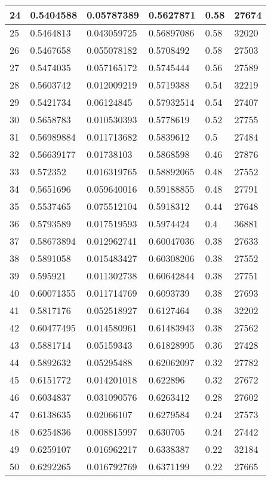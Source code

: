 \begin{longtable}{|l|l|l|l|l|l|}
24 & 0.5404588 & 0.05787389 & 0.5627871 & 0.58 & 27674 \\ \hline 
25 & 0.5464813 & 0.043059725 & 0.56897086 & 0.58 & 32020 \\ \hline 
26 & 0.5467658 & 0.055078182 & 0.5708492 & 0.58 & 27503 \\ \hline 
27 & 0.5474035 & 0.057165172 & 0.5745444 & 0.56 & 27589 \\ \hline 
28 & 0.5603742 & 0.012009219 & 0.5719388 & 0.54 & 32219 \\ \hline 
29 & 0.5421734 & 0.06124845 & 0.57932514 & 0.54 & 27407 \\ \hline 
30 & 0.5658783 & 0.010530393 & 0.5778619 & 0.52 & 27755 \\ \hline 
31 & 0.56989884 & 0.011713682 & 0.5839612 & 0.5 & 27484 \\ \hline 
32 & 0.56639177 & 0.01738103 & 0.5868598 & 0.46 & 27876 \\ \hline 
33 & 0.572352 & 0.016319765 & 0.58892065 & 0.48 & 27552 \\ \hline 
34 & 0.5651696 & 0.059640016 & 0.59188855 & 0.48 & 27791 \\ \hline 
35 & 0.5537465 & 0.075512104 & 0.5918312 & 0.44 & 27648 \\ \hline 
36 & 0.5793589 & 0.017519593 & 0.5974424 & 0.4 & 36881 \\ \hline 
37 & 0.58673894 & 0.012962741 & 0.60047036 & 0.38 & 27633 \\ \hline 
38 & 0.5891058 & 0.015483427 & 0.60308206 & 0.38 & 27552 \\ \hline 
39 & 0.595921 & 0.011302738 & 0.60642844 & 0.38 & 27751 \\ \hline 
40 & 0.60071355 & 0.011714769 & 0.6093739 & 0.38 & 27693 \\ \hline 
41 & 0.5817176 & 0.052518927 & 0.6127464 & 0.38 & 32202 \\ \hline 
42 & 0.60477495 & 0.014580961 & 0.61483943 & 0.38 & 27562 \\ \hline 
43 & 0.5881714 & 0.05159343 & 0.61828995 & 0.36 & 27428 \\ \hline 
44 & 0.5892632 & 0.05295488 & 0.62062097 & 0.32 & 27782 \\ \hline 
45 & 0.6151772 & 0.014201018 & 0.622896 & 0.32 & 27672 \\ \hline 
46 & 0.6034837 & 0.031090576 & 0.6263412 & 0.28 & 27602 \\ \hline 
47 & 0.6138635 & 0.02066107 & 0.6279584 & 0.24 & 27573 \\ \hline 
48 & 0.6254836 & 0.008815997 & 0.630705 & 0.24 & 27442 \\ \hline 
49 & 0.6259107 & 0.016962217 & 0.6338387 & 0.22 & 32184 \\ \hline 
50 & 0.6292265 & 0.016792769 & 0.6371199 & 0.22 & 27665 \\ \hline 
\end{longtable}
